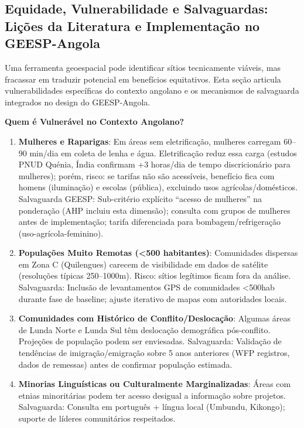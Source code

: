 \documentclass[12pt, a4paper]{article}
\begin{document}
{{{{{{{{{{{{\subsection{Equidade, Vulnerabilidade e Salvaguardas: Lições da Literatura e Implementação no GEESP-Angola}

Uma ferramenta geoespacial pode identificar sítios tecnicamente viáveis, mas fracassar em traduzir potencial em benefícios equitativos. Esta seção articula vulnerabilidades específicas do contexto angolano e os mecanismos de salvaguarda integrados no design do GEESP-Angola.

\textbf{Quem é Vulnerável no Contexto Angolano?}

\begin{enumerate}
\item \textbf{Mulheres e Raparigas}: Em áreas sem eletrificação, mulheres carregam 60--90 min/dia em coleta de lenha e água. Eletrificação reduz essa carga (estudos PNUD Quénia, Índia confirmam +3 horas/dia de tempo discricionário para mulheres); porém, risco: se tarifas não são acessíveis, benefício fica com homens (iluminação) e escolas (pública), excluindo usos agrícolas/domésticos. Salvaguarda GEESP: Sub-critério explícito ``acesso de mulheres'' na ponderação (AHP incluiu esta dimensão); consulta com grupos de mulheres antes de implementação; tarifa diferenciada para bombagem/refrigeração (uso-agrícola-feminino).

\item \textbf{Populações Muito Remotas (<500 habitantes)}: Comunidades dispersas em Zona C (Quilengues) carecem de visibilidade em dados de satélite (resoluções típicas 250--1000m). Risco: sítios legítimos ficam fora da análise. Salvaguarda: Inclusão de levantamentos GPS de comunidades <500hab durante fase de baseline; ajuste iterativo de mapas com autoridades locais.

\item \textbf{Comunidades com Histórico de Conflito/Deslocação}: Algumas áreas de Lunda Norte e Lunda Sul têm deslocação demográfica pós-conflito. Projeções de população podem ser enviesadas. Salvaguarda: Validação de tendências de imigração/emigração sobre 5 anos anteriores (WFP registros, dados de remessas) antes de confirmar população estimada.

\item \textbf{Minorias Linguísticas ou Culturalmente Marginalizadas}: Áreas com etnias minoritárias podem ter acesso desigual a informação sobre projetos. Salvaguarda: Consulta em português + língua local (Umbundu, Kikongo); suporte de líderes comunitários respeitados.
\end{enumerate}

}}}}}}}}}}}}
\end{document}
